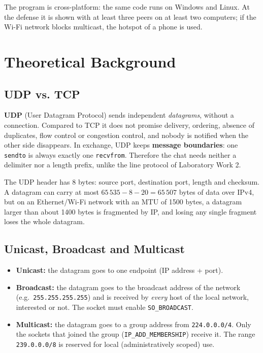 \documentclass[11pt, a4paper]{article}
\begin{document}
The program is cross-platform: the same code runs on Windows and Linux. At the defense it is shown with at least three peers on at least two computers; if the Wi-Fi network blocks multicast, the hotspot of a phone is used.

\section{Theoretical Background}

\subsection{UDP vs. TCP}
\textbf{UDP} (User Datagram Protocol) sends independent \emph{datagrams}, without a connection. Compared to TCP it does not promise delivery, ordering, absence of duplicates, flow control or congestion control, and nobody is notified when the other side disappears. In exchange, UDP keeps \textbf{message boundaries}: one \texttt{sendto} is always exactly one \texttt{recvfrom}. Therefore the chat needs neither a delimiter nor a length prefix, unlike the line protocol of Laboratory Work 2.

The UDP header has 8 bytes: source port, destination port, length and checksum. A datagram can carry at most $65\,535 - 8 - 20 = 65\,507$ bytes of data over IPv4, but on an Ethernet/Wi-Fi network with an MTU of 1500 bytes, a datagram larger than about 1400 bytes is fragmented by IP, and losing any single fragment loses the whole datagram.

\subsection{Unicast, Broadcast and Multicast}
\begin{itemize}
    \item \textbf{Unicast:} the datagram goes to one endpoint (IP address + port).
    \item \textbf{Broadcast:} the datagram goes to the broadcast address of the network (e.g.\ \texttt{255.255.255.255}) and is received by \emph{every} host of the local network, interested or not. The socket must enable \texttt{SO\_BROADCAST}.
    \item \textbf{Multicast:} the datagram goes to a group address from \texttt{224.0.0.0/4}. Only the sockets that joined the group (\texttt{IP\_ADD\_MEMBERSHIP}) receive it. The range \texttt{239.0.0.0/8} is reserved for local (administratively scoped) use.
\end{itemize}
\end{document}
